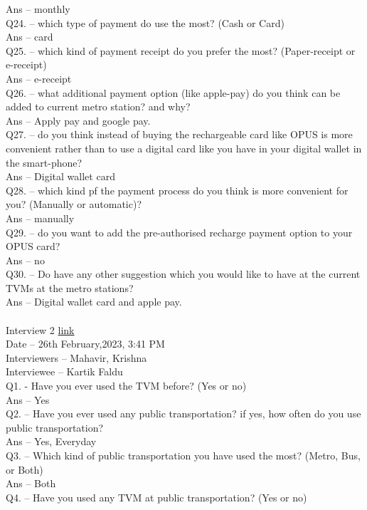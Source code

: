 \documentclass[a4paper, 11pt]{report}
\begin{document}
Ans – monthly\\
Q24. – which type of payment do use the most? (Cash or Card) \\
Ans – card\\
Q25. – which kind of payment receipt do you prefer the most? (Paper-receipt or e-receipt) \\
Ans – e-receipt\\
Q26. – what additional payment option (like apple-pay) do you think can be added to current metro station? and why? \\
Ans – Apply pay and google pay. \\
Q27. – do you think instead of buying the rechargeable card like OPUS is more convenient rather than to use a digital card like you have in your digital wallet in the smart-phone? \\
Ans – Digital wallet card\\
Q28. – which kind pf the payment process do you think is more convenient for you? (Manually or automatic)? \\
Ans – manually\\
Q29. – do you want to add the pre-authorised recharge payment option to your OPUS card? \\
Ans – no\\
Q30. – Do have any other suggestion which you would like to have at the current TVMs at the metro stations? \\
Ans – Digital wallet card and apple pay. \\
\\
Interview 2 \href{https://drive.google.com/file/d/1Hu0Sbab3ANekuTN5JrRPoGAeLahY8LPv/view?usp=share_link}{link} \\
Date – 26th February,2023, 3:41 PM\\
Interviewers – Mahavir, Krishna\\
Interviewee – Kartik Faldu\\
Q1. - Have you ever used the TVM before? (Yes or no) \\
Ans – Yes\\
Q2. – Have you ever used any public transportation? if yes, how often do you use public transportation? \\
Ans – Yes, Everyday\\
Q3. – Which kind of public transportation you have used the most? (Metro, Bus, or Both)  \\
Ans – Both\\
Q4. – Have you used any TVM at public transportation? (Yes or no) \\
\end{document}
